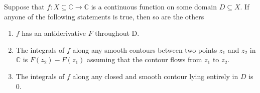 \documentclass[12pt]{book}
\begin{document}
\begin{thm}
    Suppose that $f: X \subseteq \mathbb{C} \rightarrow \mathbb{C}$ is a continuous function on some domain $D \subseteq X.$ If anyone of the following statements is true, then so are the others
    \begin{enumerate}[label = {(\roman*)}]
        \item
            $f$ has an antiderivative $F$ throughout D.
        \item
            The integrals of $f$ along any smooth contours between two points $z_1$ and $z_2$ in $\mathbb{C}$ is $F(z_2) - F(z_1)$ assuming that the contour flows from $z_1$ to $z_2$.
        \item
            The integrals of $f$ along any closed and smooth contour lying entirely in $D$ is 0.
    \end{enumerate}
\end{thm}
\end{document}
